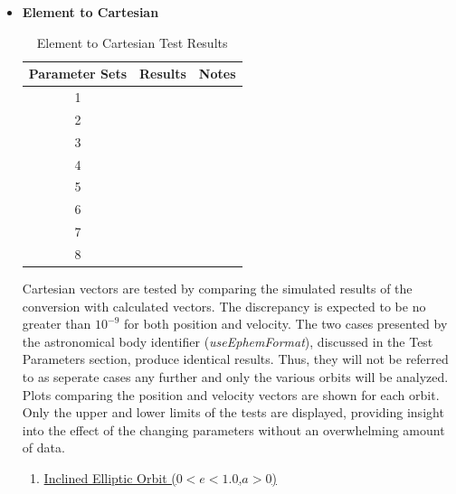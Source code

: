 \begin{itemize}
	\item \textbf{Element to Cartesian}
	\begin{table}[H]
	\caption{Element to Cartesian Test Results}
	\label{tab:Cart to Elem results}
	\centering \fontsize{10}{10}\selectfont
	\begin{tabular}{c|c|c}
		\hline
		\textbf{Parameter Sets} & \textbf{Results} & \textbf{Notes} 									\\ \hline
		1 &       	   &\\
		2 &       	   &\\	
		3 &       	   &\\	
		4 &       	   &\\
		5 &       	   &\\
		6 &       	   &\\
		7 &       	   &\\
		8 &       	   &\\
		\hline
	\end{tabular}
\end{table}
	Cartesian vectors are tested by comparing the simulated results of the conversion with calculated vectors. The discrepancy is expected to be no greater than $10^{-9}$ for both position and velocity. The two cases presented by the astronomical body identifier (\textit{useEphemFormat}), discussed in the Test Parameters section, produce identical results. Thus, they will not be referred to as seperate cases any further and only the various orbits will be analyzed. Plots comparing the position and velocity vectors are shown for each orbit. Only the upper and lower limits of the tests are displayed, providing insight into the effect of the changing parameters without an overwhelming amount of data.
	\begin{enumerate}
		\item \underline{Inclined Elliptic Orbit ($0<e<1.0$,\quad $a>0$)}\\

\end{enumerate}
\end{itemize}
